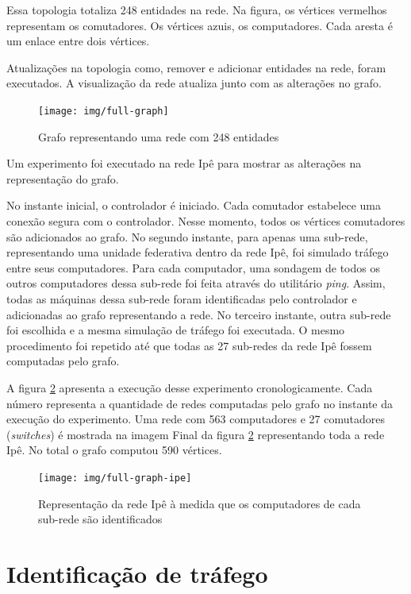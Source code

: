 Essa topologia totaliza 248 entidades na rede.
Na figura, os vértices vermelhos representam os comutadores.
Os vértices azuis, os computadores.
Cada aresta é um enlace entre dois vértices.

Atualizações na topologia como, remover e adicionar entidades na rede, foram
executados.
A visualização da rede atualiza junto com as alterações no grafo.

\begin{figure}[h!]
    \centering
    \texttt{[image: img/full-graph]}
    \caption{Grafo representando uma rede com 248 entidades}
    \label{fig:full-graph}
\end{figure}
\break
Um experimento foi executado na rede Ipê para mostrar as alterações na
representação do grafo.

No instante inicial, o controlador é iniciado.
Cada comutador estabelece uma conexão segura com o controlador.
Nesse momento, todos os vértices comutadores são adicionados ao grafo.
No segundo instante, para apenas uma sub-rede, representando uma unidade
federativa dentro da rede Ipê, foi simulado tráfego entre seus computadores.
Para cada computador, uma sondagem de todos os outros computadores dessa
sub-rede foi feita através do utilitário \emph{ping}.
Assim, todas as máquinas dessa sub-rede foram identificadas pelo controlador
e adicionadas ao grafo representando a rede.
No terceiro instante, outra sub-rede foi escolhida e a mesma simulação de
tráfego foi executada.
O mesmo procedimento foi repetido até que todas as 27 sub-redes da rede Ipê
fossem computadas pelo grafo.

A figura \ref{fig:full-graph-ipe} apresenta a execução desse experimento
cronologicamente.
Cada número representa a quantidade de redes computadas pelo grafo no instante
da execução do experimento.
Uma rede com 563 computadores e 27 comutadores (\emph{switches}) é mostrada
na imagem Final da figura \ref{fig:full-graph-ipe} representando toda a rede
Ipê.
No total o grafo computou 590 vértices.

\begin{figure}[htb!]
    \centering
    \label{fig:full-graph-ipe}
    \texttt{[image: img/full-graph-ipe]}
    \caption{Representação da rede Ipê à medida que os computadores de cada
    sub-rede são identificados}
\end{figure}


\section{Identificação de tráfego}

